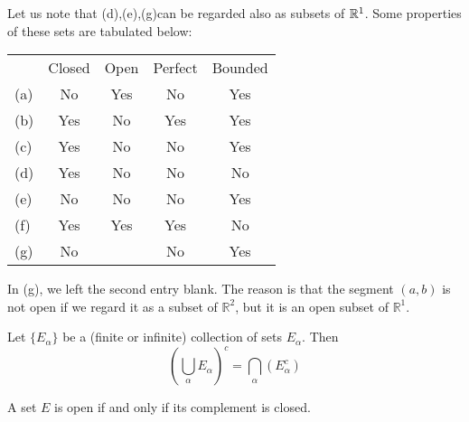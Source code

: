 Let us note that (d),(e),(g)can be regarded also as subsets of ${\protect\mathbb R}^{1}$.
Some properties of these sets are tabulated below:

\begin{center}
    \begin{tabular}{lcccc}
        & Closed & Open & Perfect & Bounded \\
    (a) & No     & Yes  & No      & Yes     \\
    (b) & Yes    & No   & Yes     & Yes     \\
    (c) & Yes    & No   & No      & Yes     \\
    (d) & Yes    & No   & No      & No      \\
    (e) & No     & No   & No      & Yes     \\
    (f) & Yes    & Yes  & Yes     & No      \\
    (g) & No     &      & No      & Yes    
    \end{tabular}
\end{center}

In (g), we left the second entry blank. 
The reason is that the segment $(a,b)$ is not open 
if we regard it as a subset of $\mathbb{R}^2$, 
but it is an open subset of $\mathbb{R}^1$.


\begin{thm}
    \label{thm:2.22}
    Let $\{E_\alpha\}$ be a (finite or infinite) collection of sets $E_\alpha$. Then
    \begin{equation}
        \label{eq:2.20}
        \left(\bigcup_{\alpha} E_{\alpha} \right)^c = \bigcap_{\alpha}( E_{\alpha}^c )
    \end{equation}
\end{thm}


\begin{thm}
    \label{thm:2.23}
    A set $E$ is open if and only if its complement is closed.
\end{thm}

